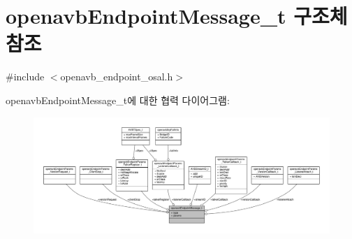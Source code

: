 \hypertarget{structopenavb_endpoint_message__t}{}\section{openavb\+Endpoint\+Message\+\_\+t 구조체 참조}
\label{structopenavb_endpoint_message__t}


{\ttfamily \#include $<$openavb\+\_\+endpoint\+\_\+osal.\+h$>$}



openavb\+Endpoint\+Message\+\_\+t에 대한 협력 다이어그램\+:
\nopagebreak
\begin{figure}[H]
\begin{center}
\leavevmode
\includegraphics[width=350pt]{structopenavb_endpoint_message__t__coll__graph}
\end{center}
\end{figure}
